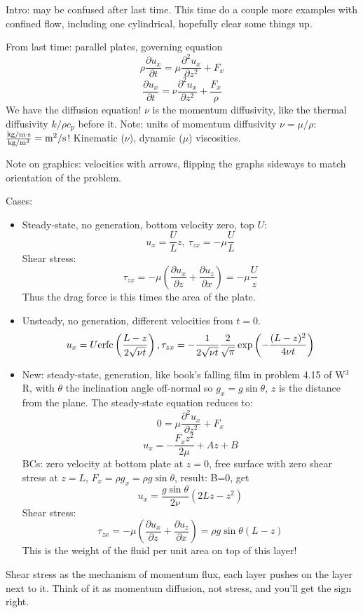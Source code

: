\documentclass{report}
\begin{document}
Intro: may be confused after last time.  This time do a couple more examples
with confined flow, including one cylindrical, hopefully clear some things up.

From last time: parallel plates, governing equation
$$\rho\frac{\partial u_x}{\partial t} = \mu\frac{\partial^2 u_x}{\partial z^2}
+ F_x$$
$$\frac{\partial u_x}{\partial t} = \nu\frac{\partial^2 u_x}{\partial z^2} +
\frac{F_x}{\rho}$$
We have the diffusion equation!  $\nu$ is the momentum diffusivity, like the
thermal diffusivity $k/\rho c_p$ before it.  Note: units of momentum
diffusivity $\nu=\mu/\rho$: $\rm\frac{kg/m\cdot s}{kg/m^3} = m^2/s$!
Kinematic ($\nu$), dynamic ($\mu$) viscosities.

Note on graphics: velocities with arrows, flipping the graphs sideways to match
orientation of the problem.

Cases:
\begin{itemize}
\item Steady-state, no generation, bottom velocity zero, top $U$:
  $$u_x = \frac{U}{L}z,\ \tau_{zx} = -\mu\frac{U}{L}$$
  Shear stress:
  $$\tau_{zx} = -\mu\left(\frac{\partial u_x}{\partial z} + \frac{\partial
      u_z}{\partial x}\right) = -\mu\frac{U}{z}$$
  Thus the drag force is this times the area of the plate.
\item Unsteady, no generation, different velocities from $t=0$.
  $$u_x = U{\rm erfc}\left(\frac{L-z}{2\sqrt{\nu t}}\right),
  \tau_{zx} = -\frac{1}{2\sqrt{\nu t}}\frac{2}{\sqrt{\pi}}
  \exp\left(-\frac{(L-z)^2}{4\nu t}\right)$$
\item New: steady-state, generation, like book's falling film in problem 4.15
  of W$^3$R, with $\theta$ the inclination angle off-normal so $g_x =
  g\sin\theta$, $z$ is the distance from the plane.  The steady-state equation
  reduces to:
  $$0 = \mu\frac{\partial^2 u_x}{\partial z^2} + F_x$$
  $$u_x = -\frac{F_x z^2}{2\mu} + Az + B$$
  BCs: zero velocity at bottom plate at $z=0$, free surface with zero shear
  stress at $z=L$, $F_x=\rho g_x = \rho g\sin\theta$, result: B=0, get
  $$u_x = \frac{g\sin\theta}{2\nu}(2Lz-z^2)$$
  Shear stress:
  $$\tau_{zx} = -\mu\left(\frac{\partial u_x}{\partial z} + \frac{\partial
      u_z}{\partial x}\right) = \rho g\sin\theta (L-z)$$
  This is the weight of the fluid per unit area on top of this layer!
\end{itemize}
Shear stress as the mechanism of momentum flux, each layer pushes on the layer
next to it.  Think of it as momentum diffusion, not stress, and you'll get the
sign right.
\end{document}
